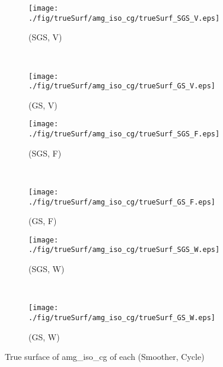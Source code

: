 \begin{figure}
  \centering
  \begin{subfigure}[h]{0.45\textwidth}
    \texttt{[image: ./fig/trueSurf/amg\_iso\_cg/trueSurf\_SGS\_V.eps]}
    \caption{(SGS, V)}
  \end{subfigure}
  ~
  \begin{subfigure}[h]{0.45\textwidth}
    \texttt{[image: ./fig/trueSurf/amg\_iso\_cg/trueSurf\_GS\_V.eps]}
    \caption{(GS, V)}
  \end{subfigure}
  
  \begin{subfigure}[h]{0.45\textwidth}
    \texttt{[image: ./fig/trueSurf/amg\_iso\_cg/trueSurf\_SGS\_F.eps]}
    \caption{(SGS, F)}
  \end{subfigure}
  ~
  \begin{subfigure}[h]{0.45\textwidth}
    \texttt{[image: ./fig/trueSurf/amg\_iso\_cg/trueSurf\_GS\_F.eps]}
    \caption{(GS, F)}
  \end{subfigure}
  
  \begin{subfigure}[h]{0.45\textwidth}
    \texttt{[image: ./fig/trueSurf/amg\_iso\_cg/trueSurf\_SGS\_W.eps]}
    \caption{(SGS, W)}
  \end{subfigure}
  ~
  \begin{subfigure}[h]{0.45\textwidth}
    \texttt{[image: ./fig/trueSurf/amg\_iso\_cg/trueSurf\_GS\_W.eps]}
    \caption{(GS, W)}
  \end{subfigure}
  \caption{True surface of amg\_iso\_cg of each (Smoother, Cycle)}\label{fig:trueSurf_amg_iso_cg}
\end{figure}

